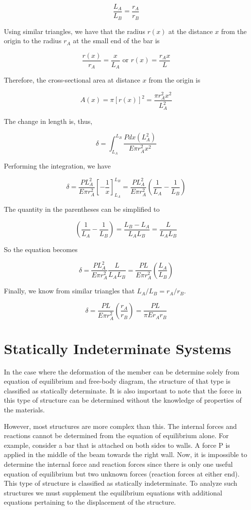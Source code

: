 \documentclass[
fontsize=10pt,
a4paper,
twosides=false,
open=any,
svgnames,
]{kaobook} %
\begin{document}
\begin{example}
\[\frac{L_A}{L_B} = \frac{r_A}{r_B}\]	

Using similar triangles, we have that the radius $r(x)$ at the distance $x$ from the origin to the radius $r_A$ at the small end of the bar is

\[\frac{r(x)}{r_A} = \frac{x}{L_A} \text{  or  } r(x) = \frac{r_Ax}{L}\]	

Therefore, the cross-sectional area at distance $x$ from the origin is

\[A(x) = \pi [r(x)]^2 = \frac{\pi r_A^2x^2}{L_A^2}\]

The change in length is, thus,

\[\delta  = \int_{L_A}^{L_B} \frac{Pdx(L_A^2)}{E\pi r_A^2x^2} \]

Performing the integration, we have

\[\delta  = \frac{PL_A^2}{E\pi r_A^2}\left[ - \frac{1}{x} \right]_{L_A}^{L_B} = \frac{PL_A^2}{E\pi r_A^2}\left( \frac{1}{L_A} - \frac{1}{L_B} \right)\]

The quantity in the parentheses can be simplified to

\[\left( \frac{1}{L_A} - \frac{1}{L_B} \right) = \frac{L_B - L_A}{L_AL_B} = \frac{L}{L_AL_B}\]	

So the equation becomes

\[\delta  = \frac{PL_A^2}{E\pi r_A^2}\frac{L}{L_AL_B} = \frac{PL}{E\pi r_A^2}\left( \frac{L_A}{L_B} \right)\]	

Finally, we know from similar triangles that $L_A/L_B = r_A/r_B$.

\[\delta  = \frac{PL}{E\pi r_A^2}\left( \frac{r_A}{r_B} \right) = \frac{PL}{\pi Er_Ar_B}\]

\end{example}

\section{Statically Indeterminate Systems}

In the case where the deformation of the member can be determine solely from equation of equilibrium and free-body diagram, the structure of that type is classified as statically determinate. It is also important to note that the force in this type of structure can be determined without the knowledge of properties of the materials.

However, most structures are more complex than this. The internal forces and reactions cannot be determined from the equation of equilibrium alone. For example, consider a bar that is attached on both sides to walls. A force P is applied in the middle of the beam towards the right wall. Now, it is impossible to determine the internal force and reaction forces since there is only one useful equation of equilibrium but two unknown forces (reaction forces at either end). This type of structure is classified as statically indeterminate. To analyze such structures we must supplement the equilibrium equations with additional equations pertaining to the displacement of the structure.
\end{document}

